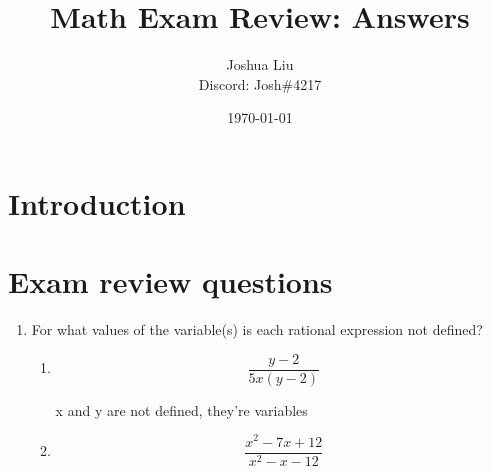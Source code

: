 \documentclass[paper=a4, fontsize=11pt]{scrartcl}
\title{Math Exam Review: Answers}
\author{Joshua Liu\\
Discord: Josh\#4217} %
\date{\today}
\begin{document}
\maketitle
\section{Introduction}

\section{Exam review questions}
\begin{enumerate}
    \item For what values of the variable(s) is each rational expression not defined?
    \begin{enumerate}
        \item $$\frac{y-2}{5x(y-2)}$$
        
        x and y are not defined, they're variables

        \item $$\frac{x^2-7x+12}{x^2-x-12}$$
        

\end{enumerate}
\end{enumerate}
\end{document}
